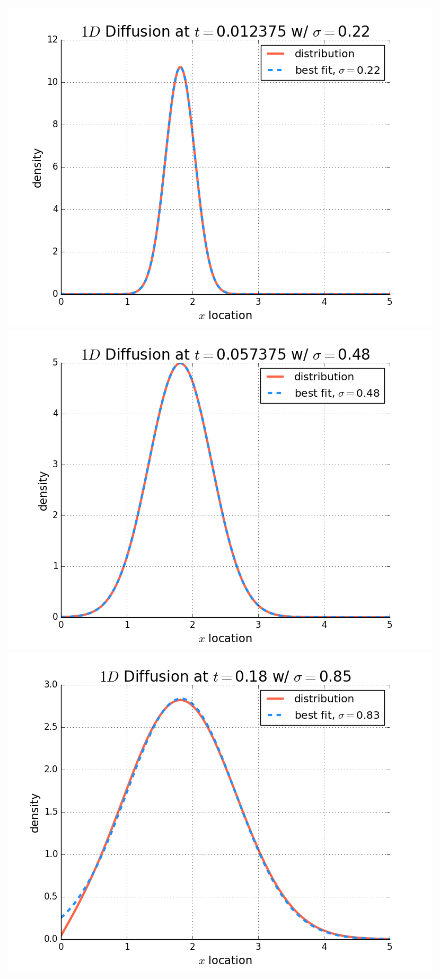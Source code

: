 \documentclass[12pt]{article}
\begin{document}
\begin{figure}[!htb]
  \includegraphics[width=\linewidth]{probdensityt110.png}
  \caption{}\label{fig:probdensity3}
\endminipage\hfill
{}
  \includegraphics[width=\linewidth]{probdensityt510.png}
  \caption{}\label{fig:probdensity4}
\endminipage\hfill
{}
  \includegraphics[width=\linewidth]{probdensityt1600.png}

\end{figure}
\end{document}
